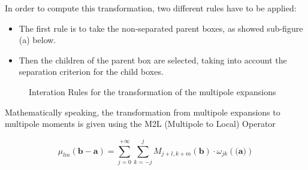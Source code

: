 \documentclass[11pt,twoside,a4paper]{report}
\begin{document}
	In order to compute this transformation, two different rules have to be applied:
	
	\begin{itemize}
	
	\item The first rule is to take the non-separated parent boxes, as showed sub-figure (a) below.
	\item Then the children of the parent box are selected, taking into account the separation criterion for the child boxes.
	
	\end{itemize}	   
   
	 
 \begin{figure}[H]
    \centering 
    \caption{Interation Rules for the transformation of the multipole expansions}
    \label{fig:multipole}
   \end{figure}   
   
	  Mathematically speaking, the transformation from multipole expansions to multipole moments is given using the  M2L (Multipole to Local) Operator
	  
	  \begin{equation}
	  \mu_{lm}(\textbf{b} - \textbf{a}) = \sum\limits_{j = 0}^{+\infty} \sum\limits_{k=-j}^{j}
	  M_{j+l,k+m}(\textbf{b}) \cdot \omega_{jk}(\textbf{(a)})
	  \end{equation}
   
\end{document}

